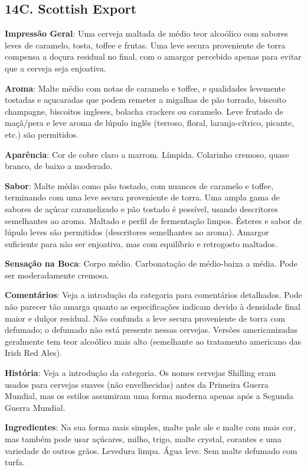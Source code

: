 \subsection*{14C. Scottish Export}
\textbf{Impressão Geral}: Uma cerveja maltada de médio teor alcoólico com sabores leves de caramelo, tosta, toffee e frutas. Uma leve secura proveniente de torra compensa a doçura residual no final, com o amargor percebido apenas para evitar que a cerveja seja enjoativa.

\textbf{Aroma}: Malte médio com notas de caramelo e toffee, e qualidades levemente tostadas e açucaradas que podem remeter a migalhas de pão torrado, biscoito champagne, biscoitos ingleses, bolacha crackers ou caramelo. Leve frutado de maçã/pera e leve aroma de lúpulo inglês (terroso, floral, laranja-cítrico, picante, etc.) são permitidos.

\textbf{Aparência}: Cor de cobre claro a marrom. Límpida. Colarinho cremoso, quase branco, de baixo a moderado.

\textbf{Sabor}: Malte médio como pão tostado, com nuances de caramelo e toffee, terminando com uma leve secura proveniente de torra. Uma ampla gama de sabores de açúcar caramelizado e pão tostado é possível, usando descritores semelhantes ao aroma. Maltado e perfil de fermentação limpos. Ésteres e sabor de lúpulo leves são permitidos (descritores semelhantes ao aroma). Amargor suficiente para não ser enjoativa, mas com equilíbrio e retrogosto maltados.

\textbf{Sensação na Boca}: Corpo médio. Carbonatação de médio-baixa a média. Pode ser moderadamente cremosa.

\textbf{Comentários}:  Veja a introdução da categoria para comentários detalhados. Pode não parecer tão amarga quanto as especificações indicam devido à densidade final maior e dulçor residual. Não confunda  a leve secura proveniente de torra com defumado; o defumado não está presente nessas cervejas. Versões americanizadas geralmente tem teor alcoólico mais alto (semelhante ao tratamento americano das Irish Red Ales).

\textbf{História}: Veja a introdução da categoria. Os nomes cervejas Shilling eram usados para cervejas suaves (não envelhecidas) antes da Primeira Guerra Mundial, mas os estilos assumiram uma forma moderna apenas após a Segunda Guerra Mundial.

\textbf{Ingredientes}: Na sua forma mais simples, malte pale ale e malte com mais cor, mas também pode usar açúcares, milho, trigo, malte crystal, corantes e uma variedade de outros grãos. Levedura limpa. Água leve. Sem malte defumado com turfa.

